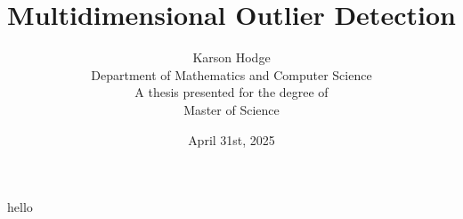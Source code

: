 \documentclass{article}
\title{Multidimensional Outlier Detection}
\author{Karson Hodge\\
Department of Mathematics and Computer Science\\
A thesis presented for the degree of \\ Master of Science}
\date{April 31st, 2025}
\begin{document}
\maketitle

\newpage
hello
\end{document}
